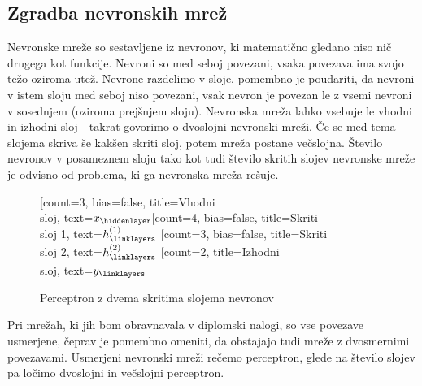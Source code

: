 \documentclass[mat1]{fmfdelo}
\begin{document}
\subsection{Zgradba nevronskih mrež}
Nevronske mreže so sestavljene iz nevronov, ki matematično gledano niso nič drugega kot funkcije. Nevroni so med seboj povezani, vsaka povezava ima svojo težo oziroma utež. Nevrone razdelimo v sloje, pomembno je poudariti, da nevroni v istem sloju med seboj niso povezani, vsak nevron je povezan le z vsemi nevroni v sosednjem (oziroma prejšnjem sloju). Nevronska mreža lahko vsebuje le vhodni in izhodni sloj - takrat govorimo o dvoslojni nevronski mreži. Če se med tema slojema skriva še kakšen skriti sloj, potem mreža postane večslojna. Število nevronov v posameznem sloju tako kot tudi število skritih slojev nevronske mreže je odvisno od problema, ki ga nevronska mreža rešuje.
%
\begin{figure}
\centering
    \begin{neuralnetwork}[height=4]
        \newcommand{\x}[2]{$x_#2$}
        \newcommand{\y}[2]{$y_#2$}
        \newcommand{\hfirst}[2]{\small $h^{(1)}_#2$}
        \newcommand{\hsecond}[2]{\small $h^{(2)}_#2$}
        [count=3, bias=false, title=Vhodni\\sloj, text=\x]
        \hiddenlayer[count=4, bias=false, title=Skriti\\sloj 1, text=\hfirst] \linklayers
        \hiddenlayer[count=3, bias=false, title=Skriti\\sloj 2, text=\hsecond] \linklayers
        \outputlayer[count=2, title=Izhodni\\sloj, text=\y] \linklayers
    \end{neuralnetwork}
\label{mreza}
\caption{Perceptron z dvema skritima slojema nevronov}
\end{figure}
%
Pri mrežah, ki jih bom obravnavala v diplomski nalogi, so vse povezave usmerjene, čeprav je pomembno omeniti, da obstajajo tudi mreže z dvosmernimi povezavami. Usmerjeni nevronski mreži rečemo perceptron, glede na število slojev pa ločimo dvoslojni in večslojni perceptron.  
%
\end{document}
